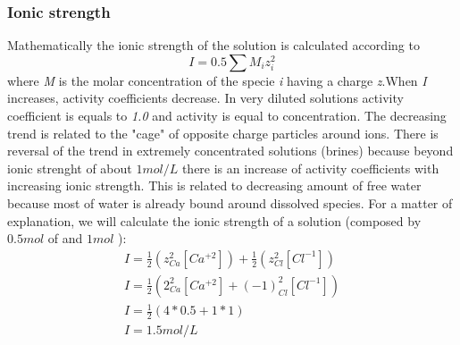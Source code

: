\documentclass[ppgc,mestrado,english]{iiufrgs}
\begin{document}
\subsubsection{Ionic strength}
Mathematically the ionic strength of the solution is calculated according to
\begin{equation} \label{eq:ionicStrength}
I = 0.5 \sum{M_i z_i^2}
\end{equation}
where \emph{M} is the molar concentration of the specie \emph{i} having a charge \emph{z}.When \emph{I} increases, activity coefficients decrease. In very diluted solutions activity coefficient is equals to \emph{1.0} and activity is equal to concentration. The decreasing trend is related to the "cage" of opposite charge particles around ions. There is reversal of the trend in extremely concentrated solutions (brines) because beyond ionic strenght of about $1 mol/L$ there is an increase of activity coefficients with increasing ionic strength. This is related to decreasing amount of free water because most of water is already bound around dissolved species.
For a matter of explanation, we will calculate the ionic strength of a  solution (composed by $0.5 mol$ of  and $1 mol$ ):
\begin{eqnarray}
I = \frac{1}{2}  (z^2_{Ca}[Ca^{+2}]) + \frac{1}{2}  (z^2_{Cl}[Cl^{-1}]) \\
I = \frac{1}{2}  (2^2_{Ca}[Ca^{+2}] +  (-1)^2_{Cl}[Cl^{-1}]) \\
I = \frac{1}{2} (4 * 0.5 + 1 * 1) \\
I = 1.5 mol/L
\end{eqnarray}


\end{document}
